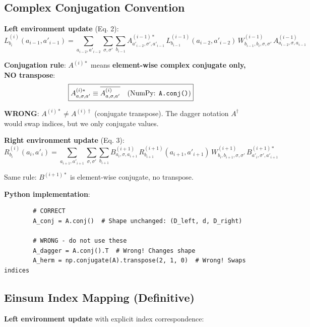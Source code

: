 \documentclass[aps,prb,onecolumn,scriptaddress]{revtex4-2}
\begin{document}
	\subsection{Complex Conjugation Convention}
	
	\textbf{Left environment update} (Eq. 2):
	\begin{equation}
		L^{(i)}_{b_i}(a_{i-1}, a'_{i-1}) = \sum_{a_{i-2}, a'_{i-2}} \sum_{\sigma, \sigma'} \sum_{b_{i-1}} A^{(i-1)*}_{a'_{i-2},\sigma',a'_{i-1}} \, L^{(i-1)}_{b_{i-1}}(a_{i-2}, a'_{i-2}) \, W^{(i-1)}_{b_{i-1},b_i,\sigma,\sigma'} \, A^{(i-1)}_{a_{i-2},\sigma,a_{i-1}}
	\end{equation}
	
	\textbf{Conjugation rule}: $A^{(i)*}$ means \textbf{element-wise complex conjugate only, NO transpose}:
	\begin{equation}
		\boxed{A^{(i)*}_{a,\sigma,a'} \equiv \overline{A^{(i)}_{a,\sigma,a'}} \quad \text{(NumPy: \texttt{A.conj()})}}
	\end{equation}
	
	\textbf{WRONG}: $A^{(i)*} \neq A^{(i)\dagger}$ (conjugate transpose). The dagger notation $A^\dagger$ would swap indices, but we only conjugate values.
	
	\textbf{Right environment update} (Eq. 3):
	\begin{equation}
		R^{(i)}_{b_i}(a_i, a'_i) = \sum_{a_{i+1}, a'_{i+1}} \sum_{\sigma, \sigma'} \sum_{b_{i+1}} B^{(i+1)}_{a_i,\sigma,a_{i+1}} \, R^{(i+1)}_{b_{i+1}}(a_{i+1}, a'_{i+1}) \, W^{(i+1)}_{b_i,b_{i+1},\sigma,\sigma'} \, B^{(i+1)*}_{a'_i,\sigma',a'_{i+1}}
	\end{equation}
	
	Same rule: $B^{(i+1)*}$ is element-wise conjugate, no transpose.
	
	\textbf{Python implementation}:
	\begin{verbatim}
		# CORRECT
		A_conj = A.conj()  # Shape unchanged: (D_left, d, D_right)
		
		# WRONG - do not use these
		A_dagger = A.conj().T  # Wrong! Changes shape
		A_herm = np.conjugate(A).transpose(2, 1, 0)  # Wrong! Swaps indices
	\end{verbatim}
	
	\subsection{Einsum Index Mapping (Definitive)}
	
	\textbf{Left environment update} with explicit index correspondence:
	
\end{document}
